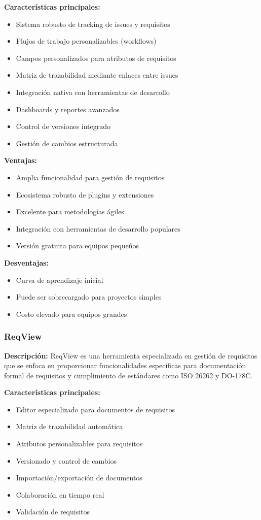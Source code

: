 \documentclass[12pt,a4paper]{article}
\begin{document}
\textbf{Características principales:}
\begin{itemize}
    \item Sistema robusto de tracking de issues y requisitos
    \item Flujos de trabajo personalizables (workflows)
    \item Campos personalizados para atributos de requisitos
    \item Matriz de trazabilidad mediante enlaces entre issues
    \item Integración nativa con herramientas de desarrollo
    \item Dashboards y reportes avanzados
    \item Control de versiones integrado
    \item Gestión de cambios estructurada
\end{itemize}

\textbf{Ventajas:}
\begin{itemize}
    \item Amplia funcionalidad para gestión de requisitos
    \item Ecosistema robusto de plugins y extensiones
    \item Excelente para metodologías ágiles
    \item Integración con herramientas de desarrollo populares
    \item Versión gratuita para equipos pequeños
\end{itemize}

\textbf{Desventajas:}
\begin{itemize}
    \item Curva de aprendizaje inicial
    \item Puede ser sobrecargado para proyectos simples
    \item Costo elevado para equipos grandes
\end{itemize}

\subsubsection{ReqView}

\textbf{Descripción:}
ReqView es una herramienta especializada en gestión de requisitos que se enfoca en proporcionar funcionalidades específicas para documentación formal de requisitos y cumplimiento de estándares como ISO 26262 y DO-178C.

\textbf{Características principales:}
\begin{itemize}
    \item Editor especializado para documentos de requisitos
    \item Matriz de trazabilidad automática
    \item Atributos personalizables para requisitos
    \item Versionado y control de cambios
    \item Importación/exportación de documentos
    \item Colaboración en tiempo real
    \item Validación de requisitos
\end{itemize}
\end{document}
